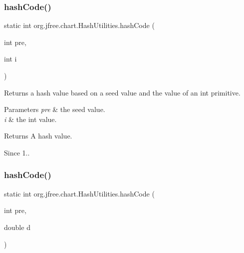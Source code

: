 \subsubsection{\texorpdfstring{hash\+Code()}{hashCode()}\hspace{0.1cm}{\footnotesize\ttfamily [2/11]}}
{\footnotesize\ttfamily static int org.\+jfree.\+chart.\+Hash\+Utilities.\+hash\+Code (\begin{DoxyParamCaption}\item[{int}]{pre,  }\item[{int}]{i }\end{DoxyParamCaption})\hspace{0.3cm}{\ttfamily [static]}}

Returns a hash value based on a seed value and the value of an int primitive.


\begin{DoxyParams}{Parameters}
{\em pre} & the seed value. \\
\hline
{\em i} & the int value.\\
\hline
\end{DoxyParams}
\begin{DoxyReturn}{Returns}
A hash value.
\end{DoxyReturn}
\begin{DoxySince}{Since}
1.. 
\end{DoxySince}
\mbox{\label{classorg_1_1jfree_1_1chart_1_1_hash_utilities_a92e7ba4f47b99af9d134c2984a91e75a}} 
\subsubsection{\texorpdfstring{hash\+Code()}{hashCode()}\hspace{0.1cm}{\footnotesize\ttfamily [3/11]}}
{\footnotesize\ttfamily static int org.\+jfree.\+chart.\+Hash\+Utilities.\+hash\+Code (\begin{DoxyParamCaption}\item[{int}]{pre,  }\item[{double}]{d }\end{DoxyParamCaption})\hspace{0.3cm}{\ttfamily [static]}}

